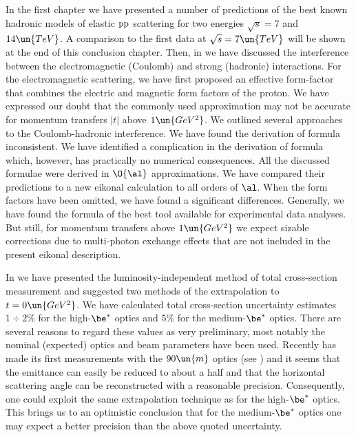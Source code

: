 \def\CaptionPrefix{C.}

In the first chapter we have presented a number of predictions of the best known hadronic models of elastic $\rm pp$ scattering for two  energies $\sqrt s = 7$ and $14\un{TeV}$. A comparison to the first  data at $\sqrt s = 7\un{TeV}$ will be shown at the end of this conclusion chapter. Then, in  we have discussed the interference between the electromagnetic (Coulomb) and strong (hadronic) interactions. For the electromagnetic scattering, we have first proposed an effective form-factor that combines the electric and magnetic form factors of the proton. We have expressed our doubt that the commonly used  approximation may not be accurate for momentum transfers $|t|$ above $1\un{GeV^2}$. We outlined several approaches to the Coulomb-hadronic interference. We have found the derivation of \WaY{} formula inconsistent. We have identified a complication in the derivation of \KaL{} formula which, however, has practically no numerical consequences. All the discussed formulae were derived in $\O{\al}$ approximations. We have compared their predictions to a new eikonal calculation to all orders of $\al$. When the form factors have been omitted, we have found a significant differences. Generally, we have found the formula of \KaL{} the best tool available for experimental data analyses. But still, for momentum transfers above $1\un{GeV^2}$ we expect sizable corrections due to multi-photon exchange effects that are not included in the present eikonal description.

In  we have presented the luminosity-independent method of total cross-section measurement and suggested two methods of the extrapolation to $t=0\un{GeV^2}$. We have calculated total cross-section uncertainty estimates $1\div2\percent$ for the high-$\be^*$ optics and $5\percent$ for the medium-$\be^*$ optics. There are several reasons to regard these values as very preliminary, most notably the nominal (expected) optics and beam parameters have been used. Recently  has made its first measurements with the $90\un{m}$ optics (see ) and it seems that the emittance can easily be reduced to about a half and that the horizontal scattering angle can be reconstructed with a reasonable precision. Consequently, one could exploit the same extrapolation technique as for the high-$\be^*$ optics. This brings us to an optimistic conclusion that for the medium-$\be^*$ optics one may expect a better precision than the above quoted uncertainty.

